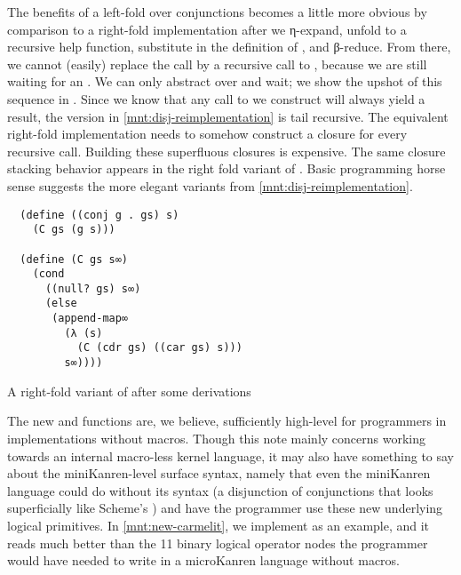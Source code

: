 \documentclass[sigplan,balance,pbalance,natbib=false]{acmart}
\begin{document}

The benefits of a left-fold over conjunctions becomes a little more
obvious by comparison to a right-fold implementation after we
η-expand, unfold to a recursive help function, substitute in the
definition of , and β-reduce. From there, we cannot
(easily) replace the  call by a recursive call
to , because we are still waiting for an .
We can only abstract over  and wait; we show the upshot
of this sequence in . Since we
know that any call to  we construct will
always yield a result, the version in \cref{mnt:disj-reimplementation}
is tail recursive. The equivalent right-fold implementation needs to
somehow construct a closure for every recursive call. Building these
superfluous closures is expensive. The same closure stacking behavior
appears in the right fold variant of . Basic
programming horse sense suggests the more elegant variants from
\cref{mnt:disj-reimplementation}.

\begin{listing}
\begin{verbatim}
  (define ((conj g . gs) s)
    (C gs (g s)))

  (define (C gs s∞)
    (cond
      ((null? gs) s∞)
      (else
       (append-map∞
         (λ (s)
           (C (cdr gs) ((car gs) s)))
         s∞))))
\end{verbatim}
  \caption{A right-fold variant of  after some derivations}\label{mnt:conj-right-fold-definition}
\end{listing}

The new  and  functions are, we
believe, sufficiently high-level for programmers in implementations
without macros. Though this note mainly concerns working towards an
internal macro-less kernel language, it may also have something to say
about the miniKanren-level surface syntax, namely that even the
miniKanren language could do without its  syntax (a
disjunction of conjunctions that looks superficially like
Scheme's ) and have the programmer use these new
underlying logical primitives. In \cref{mnt:new-carmelit}, we
implement  as an example, and it reads
much better than the 11 binary logical operator nodes the programmer
would have needed to write in a microKanren language without macros.
\end{document}
